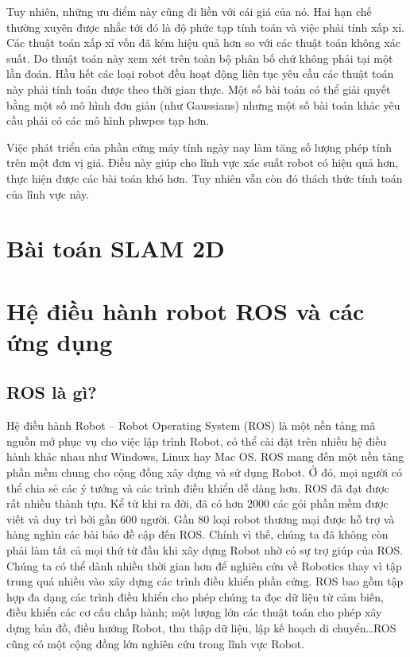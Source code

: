 Tuy nhiên, những ưu điểm này cũng đi liền với cái giá của nó. Hai hạn chế thường xuyên được nhắc tới đó là độ phức tạp tính toán và việc phải tính xấp xỉ. Các thuật toán xấp xỉ vốn đã kém hiệu quả hơn so với các thuật toán không xác suất. Do thuật toán này xem xét trên toàn bộ phân bố chứ không phải tại một lần đoán. Hầu hết các loại robot đều hoạt động liên tục yêu cầu các thuật toán này phải tính toán được theo thời gian thực. Một số bài toán có thể giải quyết bằng một số mô hình đơn giản (như Gaussians) nhưng một số bài toán khác yêu cầu phải có các mô hình phwpcs tạp hơn.

Việc phát triển của phần cứng máy tính ngày nay làm tăng số lượng phép tính trên một đơn vị giá. Điều này giúp cho lĩnh vực xác suất robot có hiệu quả hơn, thực hiện được các bài toán khó hơn. Tuy nhiên vẫn còn đó thách thức tính toán của lĩnh vực này. \cite{thrun2005probabilistic}

\section{Bài toán SLAM 2D}

\section{Hệ điều hành robot ROS và các ứng dụng}
\subsection{ROS là gì?}
Hệ điều hành Robot – Robot Operating System (ROS) là một nền tảng mã nguồn
mở phục vụ cho việc lập trình Robot, có thể cài đặt trên nhiều hệ điều hành khác
nhau như Windows, Linux hay Mac OS. ROS mang đến một nền tảng phần mềm
chung cho cộng đồng xây dựng và sử dụng Robot. Ở đó, mọi người có thể chia sẻ
các ý tưởng và các trình điều khiển dễ dàng hơn.
ROS đã đạt được rất nhiều thành tựu. Kể từ khi ra đời, đã có hơn 2000 các gói
phần mềm được viết và duy trì bởi gần 600 người. Gần 80 loại robot thương mại
được hỗ trợ và hàng nghìn các bài báo đề cập đến ROS. Chính vì thế, chúng ta đã
không còn phải làm tất cả mọi thứ từ đầu khi xây dựng Robot nhờ có sự trợ giúp
của ROS. Chúng ta có thể dành nhiều thời gian hơn để nghiên cứu về Robotics
thay vì tập trung quá nhiều vào xây dựng các trình điều khiển phần cứng.
ROS bao gồm tập hợp đa dạng các trình điều khiển cho phép chúng ta đọc dữ
liệu từ cảm biến, điều khiển các cơ cấu chấp hành; một lượng lớn các thuật toán
cho phép xây dựng bản đồ, điều hướng Robot, thu thập dữ liệu, lập kế hoạch di
chuyển\dots ROS cũng có một cộng đồng lớn nghiên cứu trong lĩnh vực Robot.

